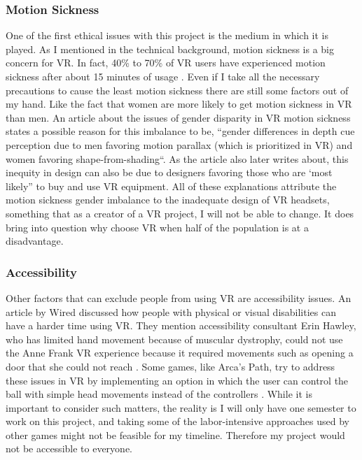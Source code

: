 \documentclass[10pt,twocolumn]{article}
\begin{document}
\subsubsection{Motion Sickness}
One of the first ethical issues with this project is the medium in which it is played. As I mentioned in the technical background, motion sickness is a big concern for VR. In fact, 40\% to 70\% of VR users have experienced motion sickness after about 15 minutes of usage \cite{motionsicknessvr2019}. Even if I take all the necessary precautions to cause the least motion sickness there are still some factors out of my hand. Like the fact that women are more likely to get motion sickness in VR than men. An article about the issues of gender disparity in VR motion sickness states a possible reason for this imbalance to be, “gender differences in depth cue perception due to men favoring motion parallax (which is prioritized in VR) and women favoring shape-from-shading“\cite{vrbarriers2018}. As the article also later writes about, this inequity in design can also be due to designers favoring those who are ‘most likely” to buy and use VR equipment\cite{vrbarriers2018}. All of these explanations attribute the motion sickness gender imbalance to the inadequate design of VR headsets, something that as a creator of a VR project, I will not be able to change. It does bring into question why choose VR when half of the population is at a disadvantage. 

\subsubsection{Accessibility}
Other factors that can exclude people from using VR are accessibility issues. An article by Wired discussed how people with physical or visual disabilities can have a harder time using VR. They mention accessibility consultant Erin Hawley, who has limited hand movement because of muscular dystrophy, could not use the Anne Frank VR experience because it required movements such as opening a door that she could not reach \cite{vraccessibility2022}. Some games, like Arca’s Path, try to address these issues in VR by implementing an option in which the user can control the ball with simple head movements instead of the controllers \cite{arcaspath2018}. While it is important to consider such matters, the reality is I will only have one semester to work on this project, and taking some of the labor-intensive approaches used by other games might not be feasible for my timeline. Therefore my project would not be accessible to everyone.
\end{document}
